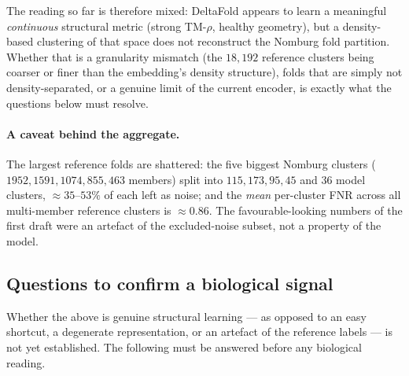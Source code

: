 \documentclass[11pt,a4paper]{article}
\theoremstyle{definition}
\begin{document}
The reading so far is therefore mixed: DeltaFold appears to learn a meaningful
\emph{continuous} structural metric (strong TM-$\rho$, healthy geometry), but a
density-based clustering of that space does not reconstruct the Nomburg fold partition.
Whether that is a granularity mismatch (the $18{,}192$ reference clusters being coarser
or finer than the embedding's density structure), folds that are simply not
density-separated, or a genuine limit of the current encoder, is exactly what the
questions below must resolve.

\paragraph{A caveat behind the aggregate.} The largest reference folds are shattered:
the five biggest Nomburg clusters ($1952,1591,1074,855,463$ members) split into
$115,173,95,45$ and $36$ model clusters, $\approx 35$--$53\%$ of each left as noise; and
the \emph{mean} per-cluster FNR across all multi-member reference clusters is
$\approx 0.86$. The favourable-looking numbers of the first draft were an artefact of
the excluded-noise subset, not a property of the model.

\subsection{Questions to confirm a biological signal}
\label{sec:results-questions}

Whether the above is genuine structural learning --- as opposed to an easy shortcut,
a degenerate representation, or an artefact of the reference labels --- is not yet
established. The following must be answered before any biological reading.
\end{document}
